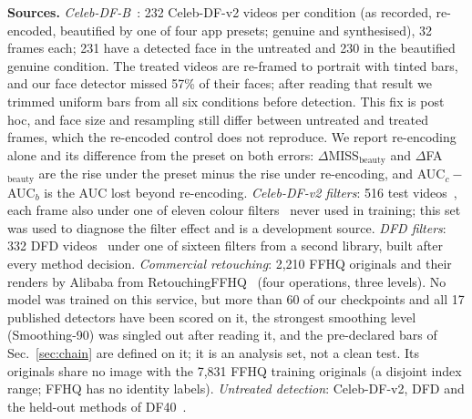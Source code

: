 \documentclass[conference]{IEEEtran}
\begin{document}
\textbf{Sources.} \emph{Celeb-DF-B}~\cite{libourel2024}: 232 Celeb-DF-v2 videos per condition (as recorded, re-encoded,
beautified by one of four app presets; genuine and synthesised), 32 frames each; 231 have a detected face in the untreated
and 230 in the beautified genuine condition. The treated videos are re-framed to portrait with tinted bars, and our face
detector missed 57\% of their faces; after reading that result we trimmed uniform bars from all six conditions before
detection. This fix is post hoc, and face size and resampling still differ between untreated and treated frames, which the
re-encoded control does not reproduce. We report re-encoding alone and its difference from the preset on both errors:
$\Delta$MISS$_\text{beauty}$ and $\Delta$FA$_\text{beauty}$ are the rise under the preset minus the rise under re-encoding,
and AUC$_c{-}$AUC$_b$ is the AUC lost beyond re-encoding. \emph{Celeb-DF-v2 filters}: 516 test videos~\cite{celebdf}, each
frame also under one of eleven colour filters~\cite{pilgram} never used in training; this set was used to diagnose the filter
effect and is a development source. \emph{DFD filters}: 332 DFD videos~\cite{dfd} under one of sixteen filters from a second
library, built after every method decision. \emph{Commercial retouching}: 2,210 FFHQ originals and their renders by Alibaba
from RetouchingFFHQ~\cite{retouchingffhq} (four operations, three levels). No model was trained on this service, but more than
60 of our checkpoints and all 17 published detectors have been scored on it, the strongest smoothing level (Smoothing-90) was
singled out after reading it, and the pre-declared bars of Sec.~\ref{sec:chain} are defined on it; it is an analysis set, not
a clean test. Its originals share no image with the 7,831 FFHQ training originals (a disjoint index range; FFHQ has no
identity labels). \emph{Untreated detection}: Celeb-DF-v2, DFD and the held-out methods of DF40~\cite{df40}.
\end{document}
